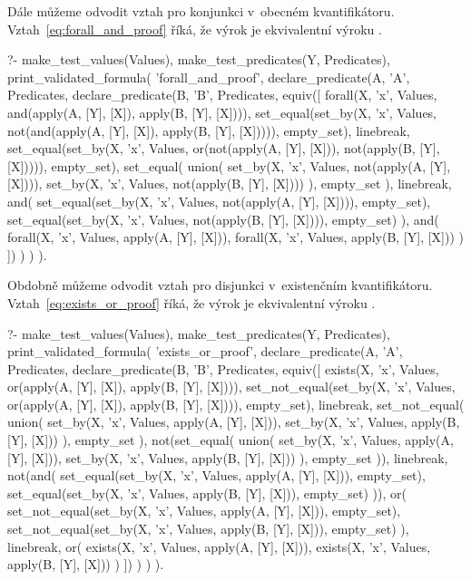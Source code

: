 Dále můžeme odvodit vztah pro konjunkci v~obecném kvantifikátoru. Vztah~\eqref{eq:forall_and_proof} říká, že výrok  je ekvivalentní výroku .

\begin{prolog}
?-	make_test_values(Values),
	make_test_predicates(Y, Predicates),
	print_validated_formula(
		'forall_and_proof',
		declare_predicate(A, 'A', Predicates,
			declare_predicate(B, 'B', Predicates,
				equiv([
					forall(X, 'x', Values, and(apply(A, [Y], [X]), apply(B, [Y], [X]))),
					set_equal(set_by(X, 'x', Values, not(and(apply(A, [Y], [X]), apply(B, [Y], [X])))), empty_set),
					linebreak,
					set_equal(set_by(X, 'x', Values, or(not(apply(A, [Y], [X])), not(apply(B, [Y], [X])))), empty_set),
					set_equal(
						union(
							set_by(X, 'x', Values, not(apply(A, [Y], [X]))),
							set_by(X, 'x', Values, not(apply(B, [Y], [X])))
						),
						empty_set
					),
					linebreak,
					and(
						set_equal(set_by(X, 'x', Values, not(apply(A, [Y], [X]))), empty_set),
						set_equal(set_by(X, 'x', Values, not(apply(B, [Y], [X]))), empty_set)
					),
					and(
						forall(X, 'x', Values, apply(A, [Y], [X])),
						forall(X, 'x', Values, apply(B, [Y], [X]))
					)
				])
			)
		)
	).
\end{prolog}

Obdobně můžeme odvodit vztah pro disjunkci v~existenčním kvantifikátoru. Vztah~\eqref{eq:exists_or_proof} říká, že výrok  je ekvivalentní výroku .

\begin{prolog}
?- 	make_test_values(Values),
	make_test_predicates(Y, Predicates),
	print_validated_formula(
		'exists_or_proof',
		declare_predicate(A, 'A', Predicates,
			declare_predicate(B, 'B', Predicates,
				equiv([
					exists(X, 'x', Values, or(apply(A, [Y], [X]), apply(B, [Y], [X]))),
					set_not_equal(set_by(X, 'x', Values, or(apply(A, [Y], [X]), apply(B, [Y], [X]))), empty_set),
					linebreak,
					set_not_equal(
						union(
							set_by(X, 'x', Values, apply(A, [Y], [X])),
							set_by(X, 'x', Values, apply(B, [Y], [X]))
						),
						empty_set
					),
					not(set_equal(
						union(
							set_by(X, 'x', Values, apply(A, [Y], [X])),
							set_by(X, 'x', Values, apply(B, [Y], [X]))
						),
						empty_set
					)),
					linebreak,
					not(and(
						set_equal(set_by(X, 'x', Values, apply(A, [Y], [X])), empty_set),
						set_equal(set_by(X, 'x', Values, apply(B, [Y], [X])), empty_set)
					)),
					or(
						set_not_equal(set_by(X, 'x', Values, apply(A, [Y], [X])), empty_set),
						set_not_equal(set_by(X, 'x', Values, apply(B, [Y], [X])), empty_set)
					),
					linebreak,
					or(
						exists(X, 'x', Values, apply(A, [Y], [X])),
						exists(X, 'x', Values, apply(B, [Y], [X]))
					)
				])
			)
		)
	).
\end{prolog}

